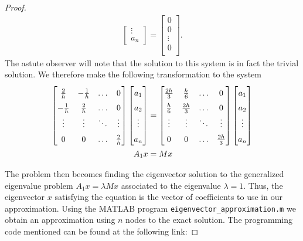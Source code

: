 \begin{proof}
\begin{align*}
\begin{bmatrix}
      \vdots \\
      a_n
    \end{bmatrix}
    =
    \begin{bmatrix}
      0 \\
      0 \\
      \vdots \\
      0 \\
    \end{bmatrix}.
  \end{align*}
  The astute observer will note that the solution to this system is in fact the
  trivial solution. We therefore make the following transformation to the system
  \begin{align*}
    \renewcommand\arraystretch{1.5}
    \begin{bmatrix}
      \frac{2}{h} & -\frac{1}{h} & \hdots & 0 \\
      -\frac{1}{h} & \frac{2}{h} & \hdots & 0 \\
      \vdots & \vdots & \ddots & \vdots  \\
      0 & 0 & \hdots & \frac{2}{h} \\
    \end{bmatrix}
    \begin{bmatrix}
      a_1 \\
      a_2 \\
      \vdots \\
      a_n
    \end{bmatrix}
    &=
    \renewcommand\arraystretch{1.5}
    \begin{bmatrix}
      \frac{2h}{3} & \frac{h}{6} & \hdots & 0 \\
      \frac{h}{6} & \frac{2h}{3} & \hdots & 0 \\
      \vdots & \vdots & \ddots & \vdots  \\
      0 & 0 & \hdots & \frac{2h}{3} \\
    \end{bmatrix}
    \begin{bmatrix}
      a_1 \\
      a_2 \\
      \vdots \\
      a_n
    \end{bmatrix} \\
    A_1 x &= M x \\
  \end{align*}

  The problem then becomes finding the eigenvector solution to the generalized
  eigenvalue problem $A_1 x = \lambda M x$ associated to the eigenvalue $\lambda = 1$.
  Thus, the eigenvector $x$ satisfying the equation is the vector of coefficients
  to use in our approximation.
  Using the MATLAB program \texttt{eigenvector\_approximation.m} we obtain
  an approximation using $n$ nodes to the exact solution.
  The programming code mentioned can be found at the following link:


\end{proof}
